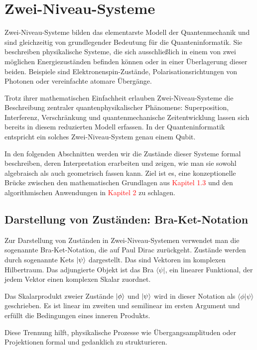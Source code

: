 \section{Zwei-Niveau-Systeme}
\label{Zwei-Niveau-Systeme}

Zwei-Niveau-Systeme bilden das elementarste Modell der Quantenmechanik und sind gleichzeitig von grundlegender Bedeutung für die Quanteninformatik. Sie beschreiben physikalische Systeme, die sich ausschließlich in einem von zwei möglichen Energiezuständen befinden können oder in einer Überlagerung dieser beiden. Beispiele sind Elektronenspin-Zustände, Polarisationsrichtungen von Photonen oder vereinfachte atomare Übergänge.

Trotz ihrer mathematischen Einfachheit erlauben Zwei-Niveau-Systeme die Beschreibung zentraler quantenphysikalischer Phänomene: Superposition, Interferenz, Verschränkung und quantenmechanische Zeitentwicklung lassen sich bereits in diesem reduzierten Modell erfassen. In der Quanteninformatik entspricht ein solches Zwei-Niveau-System genau einem Qubit.

In den folgenden Abschnitten werden wir die Zustände dieser Systeme formal beschreiben, deren Interpretation erarbeiten und zeigen, wie man sie sowohl algebraisch als auch geometrisch fassen kann. Ziel ist es, eine konzeptionelle Brücke zwischen den mathematischen Grundlagen aus \textcolor{red}{Kapitel 1.3} und den algorithmischen Anwendungen in \textcolor{red}{Kapitel 2} zu schlagen.

\subsection{Darstellung von Zuständen: Bra-Ket-Notation}
\label{Darstellung von Zuständen: Bra-Ket-Notation}
Zur Darstellung von Zuständen in Zwei-Niveau-Systemen verwendet man die sogenannte Bra-Ket-Notation, die auf Paul Dirac zurückgeht. Zustände werden durch sogenannte Kets $\ket{\psi}$ dargestellt. Das sind Vektoren im komplexen Hilbertraum. Das adjungierte Objekt ist das Bra $\langle \psi|$, ein linearer Funktional, der jedem Vektor einen komplexen Skalar zuordnet.

Das Skalarprodukt zweier Zustände $\ket{\phi}$ und $\ket{\psi}$ wird in dieser Notation als $\langle \phi | \psi \rangle$ geschrieben. Es ist linear im zweiten und semilinear im ersten Argument und erfüllt die Bedingungen eines inneren Produkts.



Diese Trennung hilft, physikalische Prozesse wie Übergangsamplituden oder Projektionen formal und gedanklich zu strukturieren.

